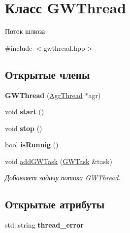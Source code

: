 \hypertarget{classGWThread}{}\section{Класс G\+W\+Thread}
\label{classGWThread}


Поток шлюза  




{\ttfamily \#include $<$gwthread.\+hpp$>$}

\subsection*{Открытые члены}
\begin{DoxyCompactItemize}
\item 
\mbox{\label{classGWThread_a17ab1c55ab7c113a9422091103ee4a94}} 
{\bfseries G\+W\+Thread} (\hyperlink{classAgrThread}{Agr\+Thread} $\ast$agr)
\item 
\mbox{\label{classGWThread_a213970ae436ad7ed34f25ef3ec111ee6}} 
void {\bfseries start} ()
\item 
\mbox{\label{classGWThread_a92d73aa5a88ec42353aef90041bd5a84}} 
void {\bfseries stop} ()
\item 
\mbox{\label{classGWThread_ae579300486967f67e1539d29af919056}} 
bool {\bfseries is\+Runnig} ()
\item 
void \hyperlink{classGWThread_a29349a2536b59b5725d847394103d081}{add\+G\+W\+Task} (\hyperlink{classGWTask}{G\+W\+Task} \&task)
\begin{DoxyCompactList}\small\item\em Добавляет задачу потока \hyperlink{classGWThread}{G\+W\+Thread}. \end{DoxyCompactList}\end{DoxyCompactItemize}
\subsection*{Открытые атрибуты}
\begin{DoxyCompactItemize}
\item 
\mbox{\label{classGWThread_a1d7e6882391aa132c708cd1b178bfb82}} 
std\+::string {\bfseries thread\+\_\+error}
\end{DoxyCompactItemize}


